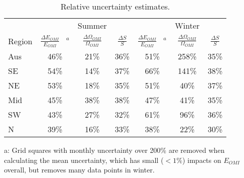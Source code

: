 \documentclass[acp, manuscript]{copernicus}
\newcommand{\Oomi}{\Omega_{OMI}} %
\newcommand{\apost}{E_{OMI}} %
\begin{document}
  \begin{table}\begin{threeparttable}
      \caption{Relative uncertainty estimates.}
      \begin{tabular}{ l | c  c  c | c c c} 
        \toprule
        & & Summer & & & Winter & \\
        Region & $\frac{\Delta \apost}{\apost}$ ~$^a$ & $\frac{\Delta \Oomi}{\Oomi}$ & $\frac{\Delta S}{S}$ 
          & $\frac{\Delta \apost}{\apost}$ ~$^a$ & $\frac{\Delta \Oomi}{\Oomi}$ & $\frac{\Delta S}{S}$ \\
        \midrule
          Aus &   46\% &   21\% &   36\% &   51\% &  258\% &   35\% \\
          SE &   54\% &   14\% &   37\% &   66\% &  141\% &   38\% \\
          NE &   53\% &   18\% &   35\% &   51\% &   40\% &   37\% \\
          Mid &   45\% &   38\% &   38\% &   47\% &   41\% &   35\% \\
          SW &   43\% &   27\% &   32\% &   61\% &   96\% &   36\% \\
          N &   39\% &   16\% &   33\% &   38\% &   22\% &   30\% \\
        \bottomrule
      \end{tabular}
      \begin{tablenotes} 
        \small
        \item a: Grid squares with monthly uncertainty over 200\% are removed when calculating the mean uncertainty, which has small ($<1\%$) impacts on $\apost$ overall, but removes many data points in winter. 
      \end{tablenotes}
      \label{BioIsop:uncertainty:tab_uncertainties}
    \end{threeparttable}\end{table}
    

%    
    
\end{document}
